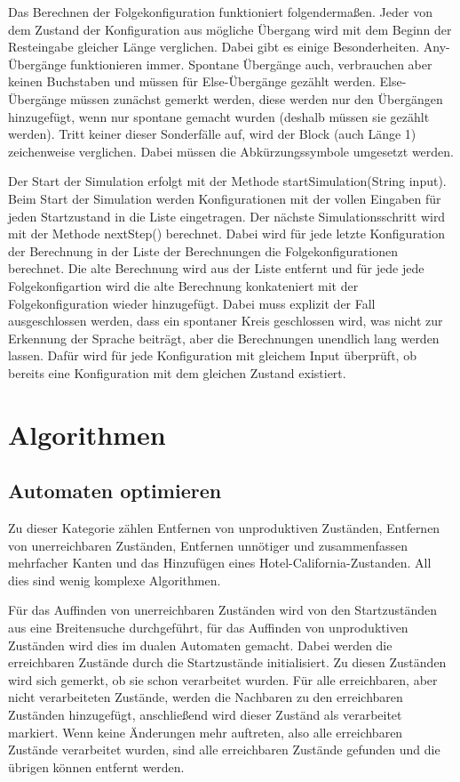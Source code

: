 Das Berechnen der Folgekonfiguration funktioniert folgendermaßen. Jeder von dem Zustand der Konfiguration aus mögliche Übergang wird mit dem Beginn der Resteingabe gleicher Länge verglichen. Dabei gibt es einige Besonderheiten. Any-Übergänge funktionieren immer. Spontane Übergänge auch, verbrauchen aber keinen Buchstaben und müssen für Else-Übergänge gezählt werden. Else-Übergänge müssen zunächst gemerkt werden, diese werden nur den Übergängen hinzugefügt, wenn nur spontane gemacht wurden (deshalb müssen sie gezählt werden). Tritt keiner dieser Sonderfälle auf, wird der Block (auch Länge 1) zeichenweise verglichen. Dabei müssen die Abkürzungssymbole umgesetzt werden.

Der Start der Simulation erfolgt mit der Methode startSimulation(String input). Beim Start der Simulation werden Konfigurationen mit der vollen Eingaben für jeden Startzustand in die Liste eingetragen. Der nächste Simulationsschritt wird mit der Methode nextStep() berechnet. Dabei wird für jede letzte Konfiguration der Berechnung in der Liste der Berechnungen die Folgekonfigurationen berechnet. Die alte Berechnung wird aus der Liste entfernt und für jede jede Folgekonfigartion wird die alte Berechnung konkateniert mit der Folgekonfiguration wieder hinzugefügt. Dabei muss explizit der Fall ausgeschlossen werden, dass ein spontaner Kreis geschlossen wird, was nicht zur Erkennung der Sprache beiträgt, aber die Berechnungen unendlich lang werden lassen. Dafür wird für jede Konfiguration mit gleichem Input überprüft, ob bereits eine Konfiguration mit dem gleichen Zustand existiert.
\section{Algorithmen}
\subsection{Automaten optimieren}
Zu dieser Kategorie zählen Entfernen von unproduktiven Zuständen, Entfernen von unerreichbaren Zuständen, Entfernen unnötiger und zusammenfassen mehrfacher Kanten und das Hinzufügen eines Hotel-California-Zustanden. All dies sind wenig komplexe Algorithmen.

Für das Auffinden von unerreichbaren Zuständen wird von den Startzuständen aus eine Breitensuche durchgeführt, für das Auffinden von unproduktiven Zuständen wird dies im dualen Automaten gemacht. Dabei werden die erreichbaren Zustände durch die Startzustände initialisiert. Zu diesen Zuständen wird sich gemerkt, ob sie schon verarbeitet wurden. Für alle erreichbaren, aber nicht verarbeiteten Zustände, werden die Nachbaren zu den erreichbaren Zuständen hinzugefügt, anschließend wird dieser Zuständ als verarbeitet markiert. Wenn keine Änderungen mehr auftreten, also alle erreichbaren Zustände verarbeitet wurden, sind alle erreichbaren Zustände gefunden und die übrigen können entfernt werden.

